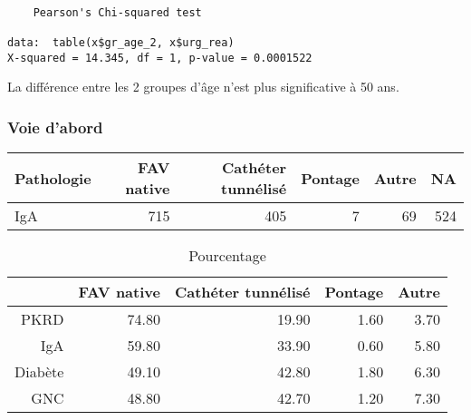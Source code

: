 \documentclass[11pt,a4paper]{article}\usepackage[]{graphicx}\usepackage[]{color}
\makeatletter
\newenvironment{kframe}{%
 \def\at@end@of@kframe{}%
 \ifinner\ifhmode%
  \def\at@end@of@kframe{\end{minipage}}%
  \begin{minipage}{\columnwidth}%
 \fi\fi%
 \def\FrameCommand##1{\hskip\@totalleftmargin \hskip-\fboxsep
 \colorbox{shadecolor}{##1}\hskip-\fboxsep
     \hskip-\linewidth \hskip-\@totalleftmargin \hskip\columnwidth}%
 \MakeFramed {\advance\hsize-\width
   \@totalleftmargin\z@ \linewidth\hsize
   \@setminipage}}%
 {\par\unskip\endMakeFramed%
 \at@end@of@kframe}
\newenvironment{knitrout}{}{} %
\makeatother
\begin{document}
\begin{knitrout}
\color{fgcolor}\begin{kframe}
\begin{verbatim}

	Pearson's Chi-squared test

data:  table(x$gr_age_2, x$urg_rea)
X-squared = 14.345, df = 1, p-value = 0.0001522
\end{verbatim}
\end{kframe}
\end{knitrout}

La différence entre les 2 groupes d'âge n'est plus significative à 50 ans.

  \subsubsection*{Voie d’abord}

\begin{table}[ht]
\centering
\begin{tabular}{lrrrrr}
  \hline
Pathologie & FAV native & Cathéter tunnélisé & Pontage & Autre & NA \\ 
  \hline
IgA & 715 & 405 &   7 &  69 & 524 \\ 
   \hline
\end{tabular}
\end{table}
\begin{table}[ht]
\centering
\begin{tabular}{rrrrr}
  \hline
 & FAV native & Cathéter tunnélisé & Pontage & Autre \\ 
  \hline
PKRD & 74.80 & 19.90 & 1.60 & 3.70 \\ 
  IgA & 59.80 & 33.90 & 0.60 & 5.80 \\ 
  Diabète & 49.10 & 42.80 & 1.80 & 6.30 \\ 
  GNC & 48.80 & 42.70 & 1.20 & 7.30 \\ 
   \hline
\end{tabular}
\caption{Pourcentage} 
\end{table}
\end{document}
